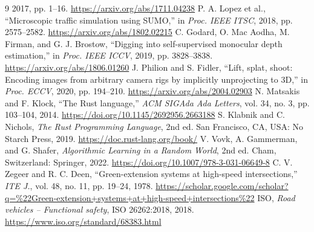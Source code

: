 \documentclass[conference, a4paper]{IEEEtran}
\theoremstyle{plain}
\begin{document}
\begin{thebibliography}{9}
2017, pp. 1--16. \url{https://arxiv.org/abs/1711.04238}
P. A. Lopez et al., ``Microscopic traffic simulation using SUMO,'' in
\textit{Proc. IEEE ITSC}, 2018, pp. 2575--2582.
\url{https://arxiv.org/abs/1802.02215}
C. Godard, O. Mac Aodha, M. Firman, and G. J. Brostow, ``Digging into
self-supervised monocular depth estimation,'' in \textit{Proc. IEEE ICCV},
2019, pp. 3828--3838. \url{https://arxiv.org/abs/1806.01260}
J. Philion and S. Fidler, ``Lift, splat, shoot: Encoding images from
arbitrary camera rigs by implicitly unprojecting to 3D,'' in \textit{Proc.
ECCV}, 2020, pp. 194--210. \url{https://arxiv.org/abs/2004.02903}
N. Matsakis and F. Klock, ``The Rust language,'' \textit{ACM SIGAda Ada
Letters}, vol. 34, no. 3, pp. 103--104, 2014.
\url{https://doi.org/10.1145/2692956.2663188}
S. Klabnik and C. Nichols, \textit{The Rust Programming Language}, 2nd ed.
San Francisco, CA, USA: No Starch Press, 2019.
\url{https://doc.rust-lang.org/book/}
V. Vovk, A. Gammerman, and G. Shafer, \textit{Algorithmic Learning in a
Random World}, 2nd ed. Cham, Switzerland: Springer, 2022.
\url{https://doi.org/10.1007/978-3-031-06649-8}
C. V. Zegeer and R. C. Deen, ``Green-extension systems at high-speed
intersections,'' \textit{ITE J.}, vol. 48, no. 11, pp. 19--24, 1978.
\url{https://scholar.google.com/scholar?q=%22Green-extension+systems+at+high-speed+intersections%22}
ISO, \textit{Road vehicles -- Functional safety}, ISO 26262:2018, 2018.
\url{https://www.iso.org/standard/68383.html}
\end{thebibliography}
\end{document}
